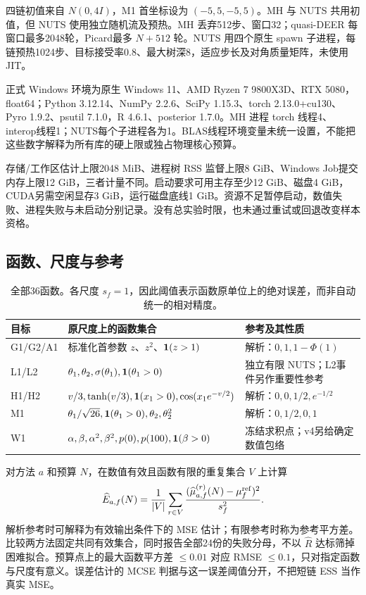 四链初值来自 $N(0,4I)$，M1 首坐标设为 $(-5,5,-5,5)$。MH 与 NUTS 共用初值，但 NUTS 使用独立随机流及预热。MH 丢弃512步、窗口32；quasi-DEER 每窗口最多2048轮，Picard最多 $N+512$ 轮。NUTS 用四个原生 spawn 子进程，每链预热1024步、目标接受率0.8、最大树深8，适应步长及对角质量矩阵，未使用 JIT。

正式 Windows 环境为原生 Windows 11、AMD Ryzen 7 9800X3D、RTX 5080，float64；Python 3.12.14、NumPy 2.2.6、SciPy 1.15.3、torch 2.13.0+cu130、Pyro 1.9.2、psutil 7.1.0，R 4.6.1、posterior 1.7.0。MH 进程 torch 线程4、interop线程1；NUTS每个子进程各为1。BLAS线程环境变量未统一设置，不能把这些数字解释为所有库的硬上限或独占物理核心预算。

存储/工作区估计上限2048 MiB、进程树 RSS 监督上限8 GiB、Windows Job提交内存上限12 GiB，三者计量不同。启动要求可用主存至少12 GiB、磁盘4 GiB，CUDA另需空闲显存3 GiB，运行磁盘底线1 GiB。资源不足暂停启动，数值失败、进程失败与未启动分别记录。没有总实验时限，也未通过重试或回退改变样本资格。

\subsection{函数、尺度与参考}
\begin{table}[htbp]\centering\smalltable
\begin{tabularx}{\linewidth}{l Y Y}\toprule
目标 & 原尺度上的函数集合 & 参考及其性质\\\midrule
G1/G2/A1 & 标准化首参数 $z$、$z^2$、$\mathbf 1(z>1)$ & 解析：$0,1,1-\Phi(1)$\\
L1/L2 & $\theta_1,\theta_2,\sigma(\theta_1),\mathbf 1(\theta_1>0)$ & 独立有限 NUTS；L2事件另作重要性参考\\
H1/H2 & $v/3,\tanh(v/3),\mathbf 1(x_1>0),\cos(x_1e^{-v/2})$ & 解析：$0,0,1/2,e^{-1/2}$\\
M1 & $\theta_1/\sqrt{26},\mathbf 1(\theta_1>0),\theta_2,\theta_2^2$ & 解析：$0,1/2,0,1$\\
W1 & $\alpha,\beta,\alpha^2,\beta^2,p(0),p(100),\mathbf 1(\beta>0)$ & 冻结求积点；v4另给确定数值包络\\\bottomrule
\end{tabularx}
\caption{全部36函数。各尺度 $s_f=1$，因此阈值表示函数原单位上的绝对误差，而非自动统一的相对精度。}
\end{table}

对方法 $a$ 和预算 $N$，在数值有效且函数有限的重复集合 $V$ 上计算
\begin{equation}\label{eq:loss}
\widehat E_{a,f}(N)=\frac{1}{|V|}\sum_{r\in V}
\frac{(\widehat\mu_{a,f}^{(r)}(N)-\mu_f^{\rm ref})^2}{s_f^2}.
\end{equation}
解析参考时可解释为有效输出条件下的 MSE 估计；有限参考时称为参考平方差。比较两方法固定共同有效集合，同时报告全部24份的失败分母，不以 $\hat R$ 达标筛掉困难拟合。预算点上的最大函数平方差 $\leq0.01$ 对应 RMSE $\leq0.1$，只对指定函数与尺度有意义。误差估计的 MCSE 判据与这一误差阈值分开，不把短链 ESS 当作真实 MSE。

